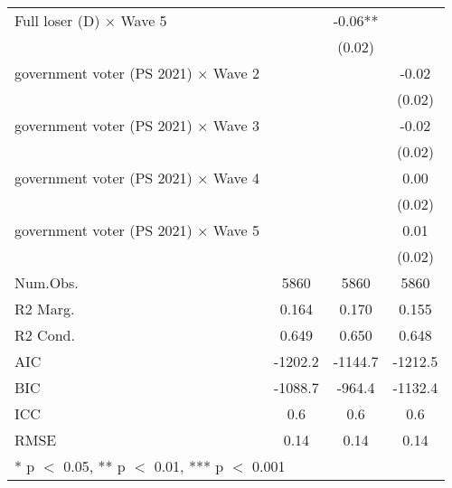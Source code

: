 \begin{table}
\begin{tabular}[t]{lccc}
Full loser (D) × Wave 5 &  & -0.06** & \\
 &  & (0.02) & \\
government voter (PS 2021) × Wave 2 &  &  & -0.02\\
 &  &  & \vphantom{3} (0.02)\\
government voter (PS 2021) × Wave 3 &  &  & -0.02\\
 &  &  & \vphantom{2} (0.02)\\
government voter (PS 2021) × Wave 4 &  &  & 0.00\\
 &  &  & \vphantom{1} (0.02)\\
government voter (PS 2021) × Wave 5 &  &  & 0.01\\
 &  &  & (0.02)\\
\midrule
Num.Obs. & 5860 & 5860 & 5860\\
R2 Marg. & 0.164 & 0.170 & 0.155\\
R2 Cond. & 0.649 & 0.650 & 0.648\\
AIC & -1202.2 & -1144.7 & -1212.5\\
BIC & -1088.7 & -964.4 & -1132.4\\
ICC & 0.6 & 0.6 & 0.6\\
RMSE & 0.14 & 0.14 & 0.14\\
\bottomrule
\multicolumn{4}{l}{\rule{0pt}{1em}* p $<$ 0.05, ** p $<$ 0.01, *** p $<$ 0.001}\\
\end{tabular}
\end{table}

